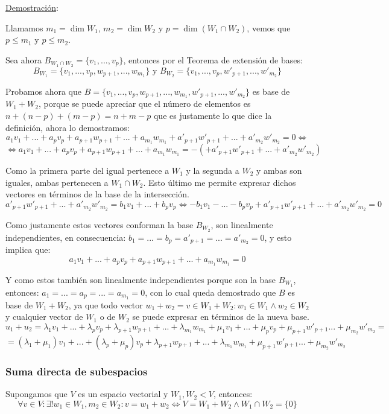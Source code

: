 \documentclass[10pt,a4paper,openright]{book}
\begin{document}
\underline{Demostración}:\par
Llamamos $m_1=\dim W_1$, $m_2=\dim W_2$ y $p=\dim (W_1\cap W_2)$, vemos que $p\leq m_1$ y $p\leq m_2$.\par
Sea ahora $B_{W_1\cap W_2}=\{v_1, ..., v_p\}$, entonces por el Teorema de extensión de bases:
$$B_{W_1}=\{v_1, ..., v_p, w_{p+1}, ..., w_{m_1}\}\mbox{ y }B_{W_2}=\{v_1, ..., v_p, w'_{p+1}, ..., w'_{m_2}\}$$

Probamos ahora que $B=\{v_1, ..., v_p, w_{p+1}, ..., w_{m_1},w'_{p+1}, ..., w'_{m_2}\}$ es base de $W_1+W_2$, porque se puede apreciar que el número de elementos es $n+(n-p)+(m-p)=n+m-p$ que es justamente lo que dice la definición, ahora lo demostramos:
$$a_1v_1+...+a_pv_p+a_{p+1}w_{p+1}+...+a_{m_1}w_{m_1}+a'_{p+1}w'_{p+1}+...+a'_{m_2}w'_{m_2}=0\Leftrightarrow$$
$$\Leftrightarrow a_1v_1+...+a_pv_p+a_{p+1}w_{p+1}+...+a_{m_1}w_{m_1}=-(+a'_{p+1}w'_{p+1}+...+a'_{m_2}w'_{m_2})$$

Como la primera parte del igual pertenece a $W_1$ y la segunda a $W_2$ y ambas son iguales, ambas pertenecen a $W_1\cap W_2$. Esto último me permite expresar dichos vectores en términos de la base de la intersección.
$$a'_{p+1}w'_{p+1}+...+a'_{m_2}w'_{m_2}=b_1v_1+...+b_pv_p\Leftrightarrow -b_1v_1-...-b_pv_p+a'_{p+1}w'_{p+1}+...+a'_{m_2}w'_{m_2}=0$$

Como justamente estos vectores conforman la base $B_{W_2}$, son linealmente independientes, en consecuencia: $b_1=...=b_p=a'_{p+1}=...=a'_{m_2}=0$, y esto implica que:
$$a_1v_1+...+a_pv_p+a_{p+1}w_{p+1}+...+a_{m_1}w_{m_1}=0$$

Y como estos también son linealmente independientes porque son la base $B_{W_1}$, entonces: $a_1=...=a_p=...=a_{m_1}=0$, con lo cual queda demostrado que $B$ es base de $W_1+W_2$, ya que todo vector $w_1+w_2=v\in W_1+W_2: w_1\in W_1 \wedge w_2\in W_2$ y cualquier vector de $W_1$ o de $W_2$ se puede expresar en términos de la nueva base.
$$u_1+u_2=\lambda_1v_1+...+\lambda_pv_p+\lambda_{p+1}w_{p+1}+...+\lambda_{m_1}w_{m_1}+\mu_1v_1+...+\mu_pv_p+\mu_{p+1}w'_{p+1}...+\mu_{m_2}w'_{m_2}=$$
$$=(\lambda_1+\mu_1)v_1+...+(\lambda_p+\mu_p)v_p+\lambda_{p+1}w_{p+1}+...+\lambda_{m_1}w_{m_1}+\mu_{p+1}w'_{p+1}...+\mu_{m_2}w'_{m_2}$$

\subsubsection*{Suma directa de subespacios}
Supongamos que $V$ es un espacio vectorial y $W_1,W_2<V$, entonces:
$$\forall v\in V: \exists!w_1\in W_1, m_2\in W_2: v=w_1+w_2\Leftrightarrow V=W_1+W_2\wedge W_1\cap W_2=\{0\}$$
\end{document}
